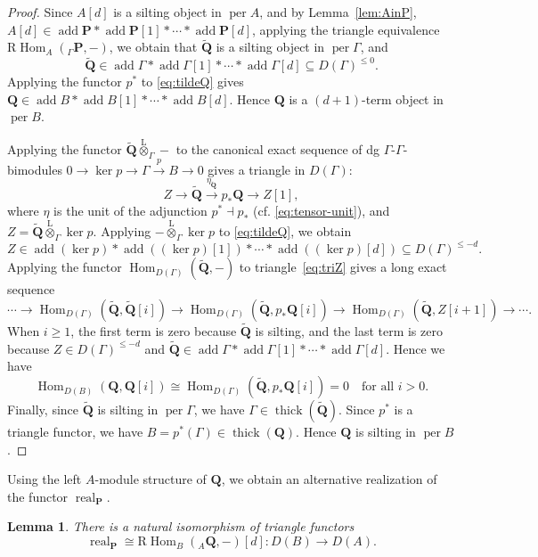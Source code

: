 \documentclass[11pt,a4paper,reqno]{amsart}
\theoremstyle{plain}
\newtheorem{lemma}[theorem]{Lemma}
\numberwithin{equation}{section}
\theoremstyle{definition}
\providecommand{\add}{\operatorname{add}}
\providecommand{\per}{\operatorname{per}}
\providecommand{\thick}{\operatorname{thick}}
\newcommand{\Hom}{\operatorname{Hom}}
\newcommand{\RHom}{\mathrm R\!\Hom}
\newcommand{\real}{\operatorname{real}}
\newcommand{\Lotimes}{\overset{\mathrm L}{\otimes}}
\newcommand{\PP}{\mathbf{P}}
\newcommand{\QQ}{\mathbf{Q}}
\begin{document}
\begin{proof}
  Since $A[d]$ is a silting object in $\per A$, and by Lemma~\ref{lem:AinP}, $A[d]\in\add\PP*\add\PP[1]*\cdots*\add\PP[d]$, applying the triangle equivalence $\RHom_A({}_\Gamma\PP,-)$, we obtain that $\widetilde{\QQ}$ is a silting object in $\per \Gamma$, and
  \begin{equation}\label{eq:tildeQ}
    \widetilde{\QQ}\in\add\Gamma*\add\Gamma[1]*\cdots*\add\Gamma[d]\subseteq D(\Gamma)^{\leq 0}.
  \end{equation}
  Applying the functor $p^*$ to \eqref{eq:tildeQ} gives $\QQ\in\add B*\add B[1]*\cdots*\add B[d]$. Hence $\QQ$ is a $(d+1)$-term object in $\per B$.

  Applying the functor $\widetilde{\QQ}\Lotimes_{\Gamma}-$ to the canonical exact sequence of dg $\Gamma$-$\Gamma$-bimodules $0\to \ker p\to\Gamma\xrightarrow{p}B\to 0$ gives a triangle in $D(\Gamma)$:
  \begin{equation}\label{eq:triZ}
    Z\to \widetilde{\QQ}\xrightarrow{\eta_{\widetilde{\QQ}}} p_*\QQ\to Z[1],
  \end{equation}
  where $\eta$ is the unit of the adjunction $p^*\dashv p_*$ (cf. \eqref{eq:tensor-unit}), and $Z=\widetilde{\QQ}\Lotimes_{\Gamma}\ker p$. Applying $-\Lotimes_\Gamma\ker p$ to \eqref{eq:tildeQ}, we obtain
\[
 Z\in\add(\ker p)*\add((\ker p)[1])*
 \cdots*\add((\ker p)[d])
 \subseteq D(\Gamma)^{\leq-d}.
\] 
Applying the functor $\Hom_{D(\Gamma)}(\widetilde{\QQ},-)$ to triangle~\eqref{eq:triZ} gives a long exact sequence
  \[
  \cdots\to\Hom_{D(\Gamma)}(\widetilde{\QQ},\widetilde{\QQ}[i])\to\Hom_{D(\Gamma)}(\widetilde{\QQ},p_*\QQ[i])\to\Hom_{D(\Gamma)}(\widetilde{\QQ},Z[i+1])\to\cdots.
  \]
  When $i\geq 1$, the first term is zero because $\widetilde{\QQ}$ is silting, and the last term is zero because $Z\in D(\Gamma)^{\leq-d}$ and $\widetilde{\QQ}\in\add\Gamma*\add\Gamma[1]*\cdots*\add\Gamma[d]$. Hence we have
  \[\Hom_{D(B)}(\QQ,\QQ[i])\cong\Hom_{D(\Gamma)}(\widetilde{\QQ},p_*\QQ[i])=0\quad\text{for all }i>0.\]
  Finally, since $\widetilde{\QQ}$ is silting in $\per \Gamma$, we have $\Gamma\in\thick(\widetilde{\QQ})$. Since $p^*$ is a triangle functor, we have $B=p^*(\Gamma)\in\thick(\QQ)$. Hence $\QQ$ is silting in $\per B$.
\end{proof}

Using the left $A$-module structure of $\QQ$, we obtain an alternative realization of the functor $\real_{\PP}$.

\begin{lemma}\label{lem:real-via-Q}
There is a natural isomorphism of triangle functors
\begin{equation}\label{eq:RHomcongreal}
 \real_{\PP}\cong\RHom_B({}_A\QQ,-)[d]\colon D(B)\to D(A).
\end{equation}
\end{lemma}
\end{document}
